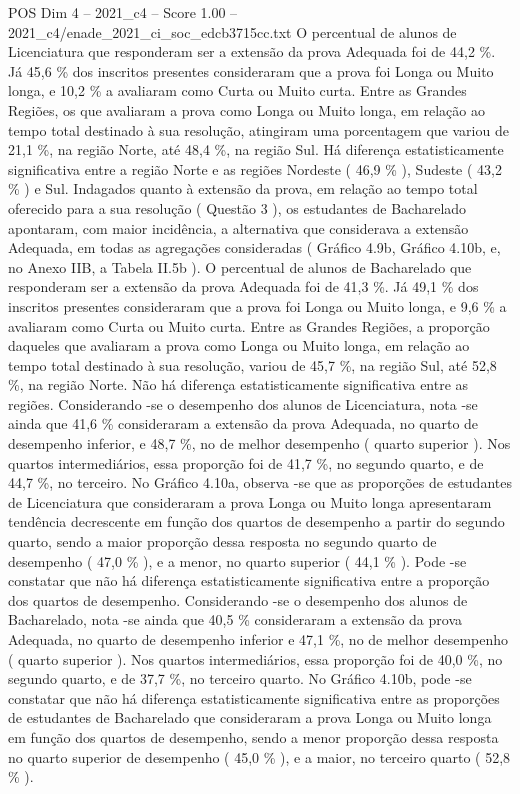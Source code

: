\begin{textsample}{POS Dim 4 – 2021\_c4 – Score 1.00 – 2021\_c4/enade\_2021\_ci\_soc\_edcb3715cc.txt}
O percentual de alunos de Licenciatura que responderam ser a extensão da prova Adequada foi de 44,2 \%.
Já 45,6 \% dos inscritos presentes consideraram que a prova foi Longa ou Muito longa, e 10,2 \% a avaliaram como Curta ou Muito curta.
Entre as Grandes Regiões, os que avaliaram a prova como Longa ou Muito longa, em relação ao tempo total destinado à sua resolução, atingiram uma porcentagem que variou de 21,1 \%, na região Norte, até 48,4 \%, na região Sul.
Há diferença estatisticamente significativa entre a região Norte e as regiões Nordeste ( 46,9 \% ), Sudeste ( 43,2 \% ) e Sul.
Indagados quanto à extensão da prova, em relação ao tempo total oferecido para a sua resolução ( Questão 3 ), os estudantes de Bacharelado apontaram, com maior incidência, a alternativa que considerava a extensão Adequada, em todas as agregações consideradas ( Gráfico 4.9b, Gráfico 4.10b, e, no Anexo IIB, a Tabela II.5b ).
O percentual de alunos de Bacharelado que responderam ser a extensão da prova Adequada foi de 41,3 \%.
Já 49,1 \% dos inscritos presentes consideraram que a prova foi Longa ou Muito longa, e 9,6 \% a avaliaram como Curta ou Muito curta.
Entre as Grandes Regiões, a proporção daqueles que avaliaram a prova como Longa ou Muito longa, em relação ao tempo total destinado à sua resolução, variou de 45,7 \%, na região Sul, até 52,8 \%, na região Norte.
Não há diferença estatisticamente significativa entre as regiões.
Considerando -se o desempenho dos alunos de Licenciatura, nota -se ainda que 41,6 \% consideraram a extensão da prova Adequada, no quarto de desempenho inferior, e 48,7 \%, no de melhor desempenho ( quarto superior ).
Nos quartos intermediários, essa proporção foi de 41,7 \%, no segundo quarto, e de 44,7 \%, no terceiro.
No Gráfico 4.10a, observa -se que as proporções de estudantes de Licenciatura que consideraram a prova Longa ou Muito longa apresentaram tendência decrescente em função dos quartos de desempenho a partir do segundo quarto, sendo a maior proporção dessa resposta no segundo quarto de desempenho ( 47,0 \% ), e a menor, no quarto superior ( 44,1 \% ).
Pode -se constatar que não há diferença estatisticamente significativa entre a proporção dos quartos de desempenho.
Considerando -se o desempenho dos alunos de Bacharelado, nota -se ainda que 40,5 \% consideraram a extensão da prova Adequada, no quarto de desempenho inferior e 47,1 \%, no de melhor desempenho ( quarto superior ).
Nos quartos intermediários, essa proporção foi de 40,0 \%, no segundo quarto, e de 37,7 \%, no terceiro quarto.
No Gráfico 4.10b, pode -se constatar que não há diferença estatisticamente significativa entre as proporções de estudantes de Bacharelado que consideraram a prova Longa ou Muito longa em função dos quartos de desempenho, sendo a menor proporção dessa resposta no quarto superior de desempenho ( 45,0 \% ), e a maior, no terceiro quarto ( 52,8 \% ).

\end{textsample}
